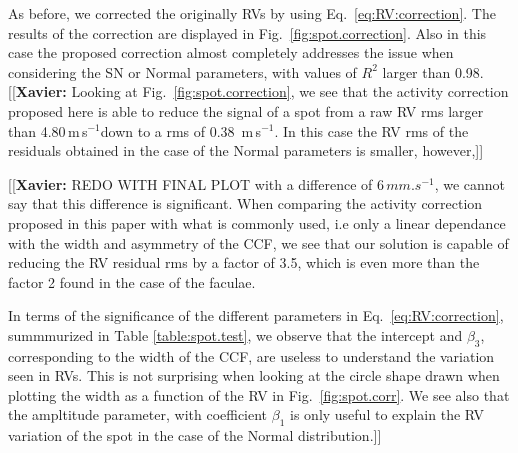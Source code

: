 \documentclass[11pt, oneside]{article}
\def\ms{\hbox{\,m\,s$^{-1}$}}         %
\newcommand{\xavier}[1]{{\color{blue}[[\textbf{Xavier: }#1]]}}
\begin{document}
As before, we corrected the originally RVs by using Eq.~\ref{eq:RV:correction}. The results of the correction are displayed in Fig.~\ref{fig:spot.correction}. Also in this case the proposed correction almost completely addresses the issue when considering the SN or Normal parameters, with values of $R^2$ larger than 0.98. \xavier{Looking at Fig.~\ref{fig:spot.correction}, we see that the activity correction proposed here is able to reduce the signal of a spot from a raw RV rms larger than 4.80\ms down to a rms of 0.38 \ms. In this case the RV rms of the residuals obtained in the case of the Normal parameters is smaller, however,} \xavier{REDO WITH FINAL PLOT with a difference of 6\,$mm.s^{-1}$, we cannot say that this difference is significant. When comparing the activity correction proposed in this paper with what is commonly used, i.e only a linear dependance with the width and asymmetry of the CCF, we see that our solution is capable of reducing the RV residual rms by a factor of 3.5, which is even more than the factor 2 found in the case of the faculae.

In terms of the significance of the different parameters in Eq.~\ref{eq:RV:correction}, summmurized in Table \ref{table:spot.test}, we observe that the intercept and $\beta_3$, corresponding to the width of the CCF, are useless to understand the variation seen in RVs. This is not surprising when looking at the circle shape drawn when plotting the width as a function of the RV in Fig.~\ref{fig:spot.corr}. We see also that the ampltitude parameter, with coefficient $\beta_1$ is only useful to explain the RV variation of the spot in the case of the Normal distribution.} 
\end{document}
